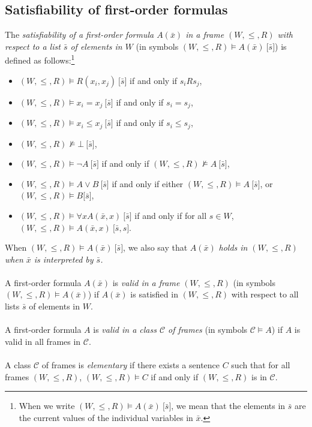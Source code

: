 \documentclass[draft]{article}
\begin{document}
\subsection{Satisfiability of first-order formulas}
%
%
The {\em satisfiability of a first-order formula $A(\bar{x})$ in a frame $(W,{\leq},{R})$ with respect to a list $\bar{s}$ of elements in $W$}\/ (in symbols $(W,{\leq},{R}){\models}A(\bar{x})\ \lbrack\bar{s}\rbrack$) is defined as follows:\footnote{When we write $(W,{\leq},{R}){\models}A(\bar{x})\ \lbrack\bar{s}\rbrack$, we mean that the elements in $\bar{s}$ are the current values of the individual variables in $\bar{x}$.}
%
%
\begin{itemize}
%
%
\item $(W,{\leq},{R}){\models}R(x_{i},x_{j})\ \lbrack\bar{s}\rbrack$ if and only if $s_{i}{R}s_{j}$,
%
%
\item $(W,{\leq},{R}){\models}x_{i}{=}x_{j}\ \lbrack\bar{s}\rbrack$ if and only if $s_{i}{=}s_{j}$,
%
%
\item $(W,{\leq},{R}){\models}x_{i}{\leq}x_{j}\ \lbrack\bar{s}\rbrack$ if and only if $s_{i}{\leq}s_{j}$,
%
%
\item $(W,{\leq},{R}){\not\models}{\bot}\ \lbrack\bar{s}\rbrack$,
%
%
\item $(W,{\leq},{R}){\models}{\neg}A\ \lbrack\bar{s}\rbrack$ if and only if $(W,{\leq},{R}){\not\models}A\ \lbrack\bar{s}\rbrack$,
%
%
\item $(W,{\leq},{R}){\models}A{\vee}B\ \lbrack\bar{s}\rbrack$ if and only if either $(W,{\leq},{R}){\models}A\ \lbrack\bar{s}\rbrack$, or $(W,{\leq},{R}){\models}B
%
%
%
%
%
%
%
$\linebreak$
%
%
%
%
%
%
\lbrack\bar{s}\rbrack$,
%
%
\item $(W,{\leq},{R}){\models}{\forall x}A(\bar{x},x)\ \lbrack\bar{s}\rbrack$ if and only if for all $s{\in}W$, $(W,{\leq},{R}){\models}A(\bar{x},x)\ \lbrack\bar{s},s\rbrack$.
%
%
\end{itemize}
%
%
When $(W,{\leq},{R}){\models}A(\bar{x})\ \lbrack\bar{s}\rbrack$, we also say that $A(\bar{x})$ {\em holds in $(W,{\leq},{R})$ when $\bar{x}$ is interpreted by $\bar{s}$.}
%
%
\\
\\
%
%
A first-order formula $A(\bar{x})$ is {\em valid in a frame $(W,{\leq},{R})$}\/ (in symbols $(W,{\leq},{R}){\models}
%
%
%
%
%
%
%
$\linebreak$
%
%
%
%
%
%
A(\bar{x})$) if $A(\bar{x})$ is satisfied in $(W,{\leq},{R})$ with respect to all lists $\bar{s}$ of elements in $W$.
%
%
\\
\\
%
%
A first-order formula $A$ is {\em valid in a class ${\mathcal C}$ of frames}\/ (in symbols ${\mathcal C}{\models}A$) if $A$ is valid in all frames in ${\mathcal C}$.
%
%
\\
\\
%
%
A class ${\mathcal C}$ of frames is {\em elementary}\/ if there exists a sentence $C$ such that for all frames $(W,{\leq},{R})$, $(W,{\leq},{R}){\models}C$ if and only if $(W,{\leq},{R})$ is in ${\mathcal C}$.
%
%
%
%
\end{document}
